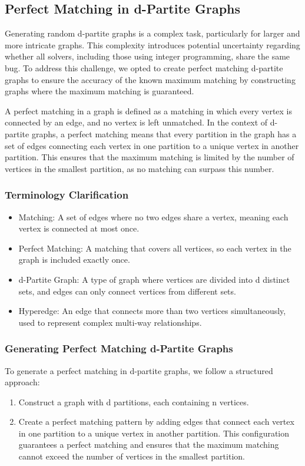 
\subsection{Perfect Matching in d-Partite Graphs}
Generating random d-partite graphs is a complex task, particularly for larger and more intricate graphs. This complexity introduces potential uncertainty regarding whether all solvers, including those using integer programming, share the same bug. To address this challenge, we opted to create perfect matching d-partite graphs to ensure the accuracy of the known maximum matching by constructing graphs where the maximum matching is guaranteed.

A perfect matching in a graph is defined as a matching in which every vertex is connected by an edge, and no vertex is left unmatched. In the context of d-partite graphs, a perfect matching means that every partition in the graph has a set of edges connecting each vertex in one partition to a unique vertex in another partition. This ensures that the maximum matching is limited by the number of vertices in the smallest partition, as no matching can surpass this number.

\subsubsection{Terminology Clarification}
\begin{itemize}
    \item Matching: A set of edges where no two edges share a vertex, meaning each vertex is connected at most once.
    \item Perfect Matching: A matching that covers all vertices, so each vertex in the graph is included exactly once.
    \item d-Partite Graph: A type of graph where vertices are divided into d distinct sets, and edges can only connect vertices from different sets.
    \item Hyperedge: An edge that connects more than two vertices simultaneously, used to represent complex multi-way relationships.
\end{itemize}

\subsubsection{Generating Perfect Matching d-Partite Graphs}
To generate a perfect matching in d-partite graphs, we follow a structured approach:
\begin{enumerate}
    \item Construct a graph with d partitions, each containing n vertices.
    \item Create a perfect matching pattern by adding edges that connect each vertex in one partition to a unique vertex in another partition. This configuration guarantees a perfect matching and ensures that the maximum matching cannot exceed the number of vertices in the smallest partition.
\end{enumerate}

